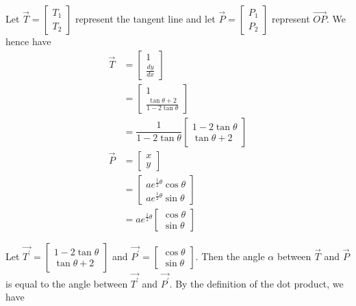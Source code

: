 \documentclass{echw}
\begin{document}
        Let $\overrightarrow{T} = \begin{bmatrix}T_1\\T_2\end{bmatrix}$ represent the tangent line and let $\overrightarrow{P} = \begin{bmatrix}P_1\\P_2\end{bmatrix}$ represent $\overrightarrow{OP}$. We hence have
        \begin{align*}
            \overrightarrow{T} &= \begin{bmatrix}1\\\frac{dy}{dx}\end{bmatrix}\\
            &= \begin{bmatrix}1\\\frac{\tan\theta+2}{1-2\tan\theta}\end{bmatrix}\\
            &= \dfrac1{1-2\tan\theta}\begin{bmatrix}1-2\tan\theta\\\tan\theta+2\end{bmatrix}\\
            \overrightarrow{P} &= \begin{bmatrix}x\\y\end{bmatrix}\\
            &= \begin{bmatrix}ae^{\frac12 \theta}\cos\theta\\ae^{\frac12\theta}\sin\theta\end{bmatrix}\\
            &= ae^{\frac12 \theta}\begin{bmatrix}\cos\theta\\\sin\theta\end{bmatrix}
        \end{align*}

        Let $\overrightarrow{T^\prime} = \begin{bmatrix}1-2\tan\theta\\\tan\theta+2\end{bmatrix}$ and $\overrightarrow{P^\prime} = \begin{bmatrix}\cos\theta\\\sin\theta\end{bmatrix}$. Then the angle $\alpha$ between $\overrightarrow{T}$ and $\overrightarrow{P}$ is equal to the angle between  $\overrightarrow{T^\prime}$ and $\overrightarrow{P^\prime}$. By the definition of the dot product, we have
\end{document}

